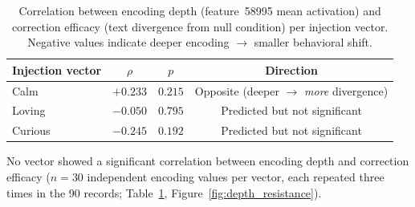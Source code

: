 \documentclass[11pt,a4paper]{article}
\begin{document}
\begin{table}[H]
\centering
\caption{Correlation between encoding depth (feature~58995 mean activation)
and correction efficacy (text divergence from null condition) per injection
vector. Negative values indicate deeper encoding $\to$ smaller behavioral
shift.}
\label{tab:depth_resistance}
\begin{tabular}{lccc}
\toprule
Injection vector & $\rho$ & $p$ & Direction \\
\midrule
Calm & $+0.233$ & $0.215$ & Opposite (deeper $\to$ \emph{more} divergence) \\
Loving & $-0.050$ & $0.795$ & Predicted but not significant \\
Curious & $-0.245$ & $0.192$ & Predicted but not significant \\
\bottomrule
\end{tabular}
\end{table}

No vector showed a significant correlation between encoding depth and
correction efficacy ($n{=}30$ independent encoding values per vector, each
repeated three times in the 90 records; Table~\ref{tab:depth_resistance},
Figure~\ref{fig:depth_resistance}).
\end{document}
